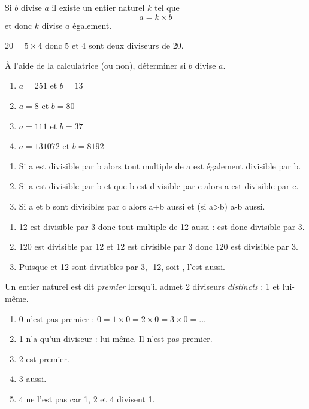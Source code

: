 \documentclass[a4paper,12pt,french]{book}
\begin{document}
\begin{remarque}
	Si $b$ divise $a$ il existe un entier naturel $k$ tel que $$a=k\times b$$ et donc $k$ divise $a$ également.
\end{remarque}

\begin{exemple}[]
	$20=5\times 4$ donc 5 et 4 sont deux diviseurs de 20.
\end{exemple}

\begin{exercice}[]
	
	À l'aide de la calculatrice (ou non), déterminer si $b$ divise $a$.
	\begin{enumerate}[\bfseries a.]
		\item 	$a=251$ et $b=13$
		\item 	$a=8$ et $b=80$
		\item 	$a=111$ et $b=37$
		\item 	$a=131072$ et $b=8192$\\
	\end{enumerate}
	
\end{exercice}


\begin{propriete}[s]
	\begin{enumerate}[\bfseries a.]
		\item 	Si a est divisible par b alors tout multiple de a est également divisible par b.
		\item 	Si a est divisible par b et que b est divisible par c alors a est divisible par c.
		\item 	Si a et b sont divisibles par c alors a+b aussi et (si a>b)  a-b aussi.
	\end{enumerate}
\end{propriete}
\begin{exemple}[s]
	\begin{enumerate}[\bfseries a.]
		\item 	12 est divisible par 3 donc tout multiple de 12 aussi :  est donc divisible par 3.
		\item 	120 est divisible par 12 et 12 est divisible par 3 donc 120 est divisible par 3.
		\item 	Puisque  et 12 sont divisibles par 3, -12, soit , l'est aussi.
	\end{enumerate}
\end{exemple}
\begin{definition}
	Un entier naturel est dit \textit{premier} lorsqu'il admet 2 diviseurs \textit{distincts} : 1 et lui-même.
	\begin{enumerate}[\textbullet]
		\item 	0 n'est pas premier : $0=1\times 0=2\times 0=3\times 0=...$
		\item 	1 n'a qu'un diviseur : lui-même. Il n'est pas premier.
		\item 	2 est premier.
		\item 	3 aussi.
		\item 	4 ne l'est pas car 1, 2 et 4 divisent 1.
	\end{enumerate}
\end{definition}
\end{document}
